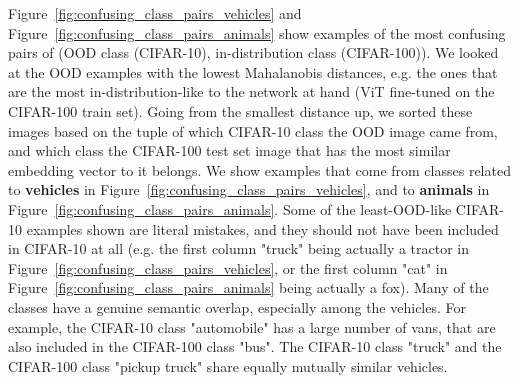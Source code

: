 \documentclass{article}
\begin{document}
Figure~\ref{fig:confusing_class_pairs_vehicles} and Figure~\ref{fig:confusing_class_pairs_animals} show examples of the most confusing pairs of (OOD class (CIFAR-10), in-distribution class (CIFAR-100)). We looked at the OOD examples with the lowest Mahalanobis distances, e.g. the ones that are the most in-distribution-like to the network at hand (ViT fine-tuned on the CIFAR-100 train set). Going from the smallest distance up, we sorted these images based on the tuple of which CIFAR-10 class the OOD image came from, and which class the CIFAR-100 test set image that has the most similar embedding vector to it belongs. We show examples that come from classes related to \textbf{vehicles} in Figure~\ref{fig:confusing_class_pairs_vehicles}, and to \textbf{animals} in Figure~\ref{fig:confusing_class_pairs_animals}. Some of the least-OOD-like CIFAR-10 examples shown are literal mistakes, and they should not have been included in CIFAR-10 at all (e.g. the first column "truck" being actually a tractor in Figure~\ref{fig:confusing_class_pairs_vehicles}, or the first column "cat" in Figure~\ref{fig:confusing_class_pairs_animals} being actually a fox). Many of the classes have a genuine semantic overlap, especially among the vehicles. For example, the CIFAR-10 class "automobile" has a large number of vans, that are also included in the CIFAR-100 class "bus". The CIFAR-10 class "truck" and the CIFAR-100 class "pickup truck" share equally mutually similar vehicles.
\end{document}
